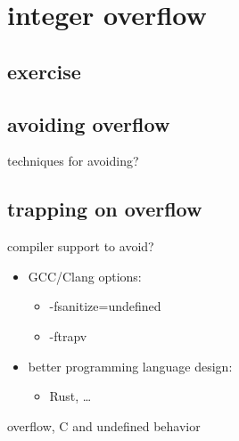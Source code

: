 

\section{integer overflow}





\subsection{exercise}


\subsection{avoiding overflow}
\begin{frame}{techniques for avoiding?}
\end{frame}
\subsection{trapping on overflow}

\begin{frame}{compiler support to avoid?}
    \begin{itemize}
    \item GCC/Clang options:
        \begin{itemize}
        \item -fsanitize=undefined
        \item -ftrapv
        \end{itemize}
    \item better programming language design:
        \begin{itemize}
        \item Rust, \ldots
        \end{itemize}
    \end{itemize}
\end{frame}


\begin{frame}{overflow, C and undefined behavior}
\end{frame}
